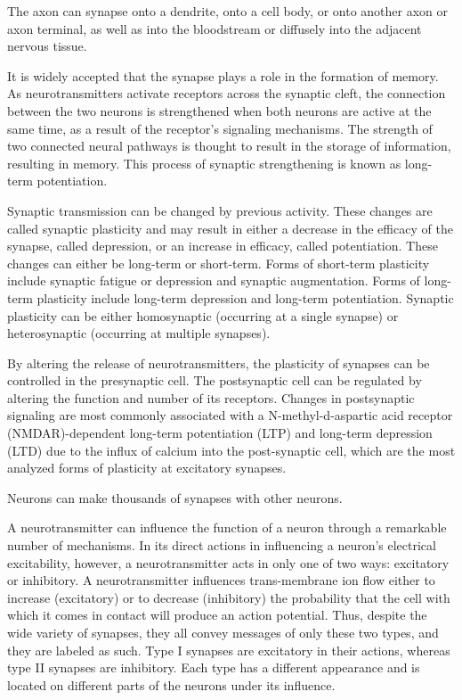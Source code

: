 The axon can synapse onto a dendrite, onto a cell body, or onto another axon or axon terminal, as well as into the bloodstream or diffusely into the adjacent nervous tissue.

It is widely accepted that the synapse plays a role in the formation of memory. As neurotransmitters activate receptors across the synaptic cleft, the connection between the two neurons is strengthened when both neurons are active at the same time, as a result of the receptor's signaling mechanisms. The strength of two connected neural pathways is thought to result in the storage of information, resulting in memory. This process of synaptic strengthening is known as long-term potentiation.

Synaptic transmission can be changed by previous activity. These changes are called synaptic plasticity and may result in either a decrease in the efficacy of the synapse, called depression, or an increase in efficacy, called potentiation. These changes can either be long-term or short-term. Forms of short-term plasticity include synaptic fatigue or depression and synaptic augmentation. Forms of long-term plasticity include long-term depression and long-term potentiation. Synaptic plasticity can be either homosynaptic (occurring at a single synapse) or heterosynaptic (occurring at multiple synapses).

By altering the release of neurotransmitters, the plasticity of synapses can be controlled in the presynaptic cell. The postsynaptic cell can be regulated by altering the function and number of its receptors. Changes in postsynaptic signaling are most commonly associated with a N-methyl-d-aspartic acid receptor (NMDAR)-dependent long-term potentiation (LTP) and long-term depression (LTD) due to the influx of calcium into the post-synaptic cell, which are the most analyzed forms of plasticity at excitatory synapses.

Neurons can make thousands of synapses with other neurons.

A neurotransmitter can influence the function of a neuron through a remarkable number of mechanisms. In its direct actions in influencing a neuron's electrical excitability, however, a neurotransmitter acts in only one of two ways: excitatory or inhibitory. A neurotransmitter influences trans-membrane ion flow either to increase (excitatory) or to decrease (inhibitory) the probability that the cell with which it comes in contact will produce an action potential. Thus, despite the wide variety of synapses, they all convey messages of only these two types, and they are labeled as such. Type I synapses are excitatory in their actions, whereas type II synapses are inhibitory. Each type has a different appearance and is located on different parts of the neurons under its influence.

